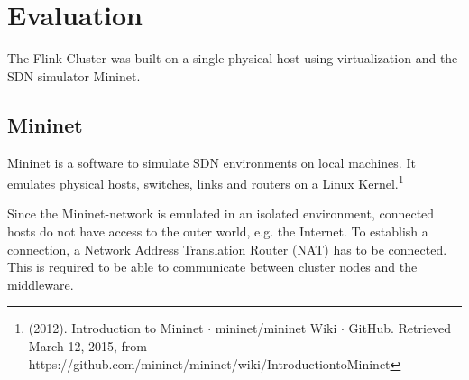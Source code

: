 \section{Evaluation}
The Flink Cluster was built on a single physical host using virtualization and the SDN simulator
Mininet.

\subsection{Mininet}
Mininet is a software to simulate SDN environments on local machines. It  emulates physical hosts,
switches, links and routers on a Linux Kernel.\footnote{(2012). Introduction to Mininet $\cdot$
mininet/mininet Wiki $\cdot$ GitHub. Retrieved March 12, 2015, from
https://github.com/mininet/mininet/wiki/Introduction­to­Mininet}

Since the Mininet-network is emulated in an isolated environment, connected hosts do not have access
to the outer world, e.g. the Internet. To establish a connection, a Network Address Translation
Router (NAT) has to be connected. This is required to be able to communicate between cluster nodes
and the middleware.

